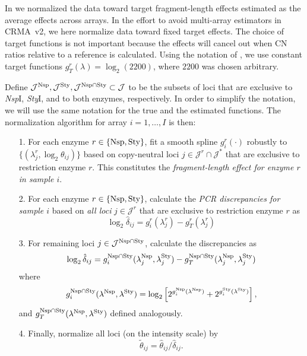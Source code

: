 \documentclass{bioinfo}
\newcommand{\NspI}{\emph{Nsp}I\xspace}
\newcommand{\StyI}{\emph{Sty}I\xspace}
\newcommand{\Nsp}{\ensuremath{\textnormal{Nsp}}\xspace}
\newcommand{\Sty}{\ensuremath{\textnormal{Sty}}\xspace}
\begin{document}
In \citet{BengtssonH_etal_2008} we normalized the data toward target fragment-length effects estimated as the average effects across arrays.  
In the effort to avoid multi-array estimators in CRMA~v2, we here normalize data toward fixed target effects.  
The choice of target functions is not important because the effects will cancel out when CN ratios relative to a reference is calculated.
Using the notation of \citet{BengtssonH_etal_2008}, we use constant target functions $g_T^r(\lambda) = \log_2(2200)$, where $2200$ was chosen arbitrary.

Define $\mathcal{J}^{\Nsp}, \mathcal{J}^{\Sty}, \mathcal{J}^{\Nsp\cap\Sty} \subset \mathcal{J}$ to be the subsets of loci that are exclusive to \NspI, \StyI, and to both enzymes, respectively.
In order to simplify the notation, we will use the same notation for the true and the estimated functions.  The normalization algorithm for array $i=1,\ldots,I$ is then:
\begin{enumerate}
 \item[1.] For each enzyme $r \in \{\Nsp, \Sty\}$, fit a smooth spline $g^{r}_{i}(\cdot)$ robustly to $\{(\lambda^{r}_{j}, \log_2\theta_{ij})\}$ based on copy-neutral loci $j \in \mathcal{J}^{r} \cap \mathcal{J^*}$ that are exclusive to restriction enzyme $r$.  This constitutes the \emph{fragment-length effect for enzyme $r$ in sample $i$}.

 \item[2.] For each enzyme $r \in \{\Nsp, \Sty\}$, calculate the \emph{PCR discrepancies for sample $i$} based on \emph{all loci} $j \in \mathcal{J}^{r}$ that are exclusive to restriction enzyme $r$ as
  \begin{equation}
    \log_2 \hat{\delta}_{ij} 
     = g^{r}_{i}(\lambda^{r}_{j}) - g^{r}_{T}(\lambda^{r}_{j})
    \label{eqnPCRbias}
  \end{equation}

 \item[3.] For remaining loci $j \in \mathcal{J}^{\Nsp\cap\Sty}$, calculate the discrepancies as
  \begin{equation}
    \log_2 \hat{\delta}_{ij} 
     = g^{\Nsp\cap\Sty}_{i}(\lambda^{\Nsp}_{j}, \lambda^{\Sty}_{j}) - g^{\Nsp\cap\Sty}_{T}(\lambda^{\Nsp}_{j}, \lambda^{\Sty}_{j})
    \label{eqnPCRbiasIIIa}
  \end{equation}
  where
  \begin{equation}
    g^{\Nsp\cap\Sty}_{i}(\lambda^{\Nsp}, \lambda^{\Sty}) = \log_2\left[
      2^{g^{\Nsp}_{i}(\lambda^{\Nsp})} + 2^{g^{\Sty}_{i}(\lambda^{\Sty})}
    \right],
    \label{eqnPCRbiasIIIb}
  \end{equation}
  and $g^{\Nsp\cap\Sty}_{T}(\lambda^{\Nsp}, \lambda^{\Sty})$ defined analogously.


 \item[4.] Finally, normalize all loci (on the intensity scale) by
  \begin{equation}
    \tilde{\theta}_{ij} = \hat\theta_{ij} / \hat{\delta}_{ij}.
    \label{eqnPCRnorm}
  \end{equation}
\end{enumerate}
\end{document}
